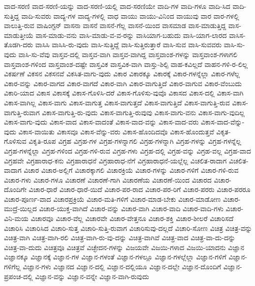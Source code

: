 {ವಾದ-ಸರಣಿ
ವಾದ-ಸರಣಿ-ಯನ್ನು
ವಾದ-ಸರಣಿ-ಯಲ್ಲಿ
ವಾದ-ಸರಣಿಯೇ
ವಾದಿ-ಗಳ
ವಾದಿ-ಗಳೂ
ವಾದಿ-ಸಿದ
ವಾದಿ-ಸುತ್ತಿದ್ದ
ವಾದಿ-ಸುವರು
ವಾದ್ಯ-ಗಳ
ವಾದ್ಯ-ಗಳಲ್ಲಿ
ವಾಧ
ವಾಯು
ವಾಯು-ವಿನಿಂದ
ವಾಯುವು
ವಾರ
ವಾರ-ಗಳಲ್ಲಿ
ವಾಲುತ್ತಿ-ರುವ
ವಾಷಿಂಗ್ಟನ್
ವಾಸನಾ
ವಾಸನೆ
ವಾಸನೆ-ಗೆಲ್ಲ
ವಾಸನೆ-ಯಿಂದ
ವಾಸಮಾಡ
ವಾಸ-ಮಾಡುತ್ತಿದ್ದ
ವಾಸ-ಮಾಡುತ್ತೀಯೆ
ವಾಸ-ಮಾಡು-ವನು
ವಾಸಿ-ಮಾಡು-ವ-ವ-ರನ್ನು
ವಾಸಿಯಾಗ-ಬಹುದು
ವಾಸಿ-ಯಾಗ-ಲಾರದ
ವಾಸಿಸ-ತೊಡಗಿ-ದರು
ವಾಸಿಸಿ
ವಾಸಿಸಿ-ರು-ವುದು
ವಾಸಿ-ಸುತ್ತಿದ್ದೆ
ವಾಸಿ-ಸುತ್ತಿರುತ್ತಾರೆ
ವಾಸಿ-ಸುವ
ವಾಸಿ-ಸುವವರು
ವಾಸಿ-ಸು-ವುದು
ವಾಸಿ-ಸು-ವೆವು
ವಾಸ್ತವ-ದಲ್ಲಿ
ವಾಸ್ತವ-ವಾಗಿ
ವಾಸ್ತವ-ವಾಗಿದ್ದ
ವಾಸ್ತವಾಂಶ-ಗಳನ್ನು
ವಾಸ್ತವಾಂಶ-ಗಳಾಗಲಿ
ವಾಸ್ತವಾಂಶ-ಗಳಿಂದ
ವಾಸ್ತವಾಂಶ-ದಷ್ಟೇ
ವಾಸ್ತವಿಕ
ವಾಸ್ತವಿಕ-ವಾಗಿ
ವಾಸ್ತು-ಶಿಲ್ಪಿ
ವಾಹ-ಕವಿಲ್ಲದೆ
ವಾಹನ-ಗಳಿ-ರ-ಲಿಲ್ಲ
ವಿಕರ್ಷಣೆ
ವಿಕಸನ
ವಿಕಸನವೆ
ವಿಕಸಿತ-ವಾಗು-ವುದು
ವಿಕಾರ
ವಿಕಾರಕ್ಕೂ
ವಿಕಾರಕ್ಕೆ
ವಿಕಾರ-ಗಳನ್ನೆಲ್ಲಾ
ವಿಕಾರ-ಗಳೆಲ್ಲ
ವಿಕಾರ-ವನ್ನು
ವಿಕಾರ-ವಾಗದ
ವಿಕಾರ-ವಾಗದೆ
ವಿಕಾರ-ವಾಗಿ
ವಿಕಾರ-ವಾಗುತ್ತಿದೆ
ವಿಕಾರ-ವಾಗುವ
ವಿಕಾರ-ವೆಂಬುದು
ವಿಕಾರಿ-ಯಾದ
ವಿಕಾಸ
ವಿಕಾಸಕ್ಕೆ
ವಿಕಾಸ-ಗೊಳಿಸಿ-ದರೆ
ವಿಕಾಸ-ಗೊಳಿಸು-ವುವೊ
ವಿಕಾಸದ
ವಿಕಾಸ-ದಲ್ಲಿ
ವಿಕಾಸ-ವಾಗಿ
ವಿಕಾಸ-ವಾಗಿಲ್ಲ
ವಿಕಾಸ-ವಾಗು
ವಿಕಾಸ-ವಾಗುತ್ತ
ವಿಕಾಸ-ವಾಗುತ್ತದೆ
ವಿಕಾಸ-ವಾಗುತ್ತಿದೆ
ವಿಕಾಸ-ವಾಗುತ್ತಿ-ರುವ
ವಿಕಾಸ-ವಾಗುತ್ತಿ-ರುವಾಗ
ವಿಕಾಸ-ವಾಗುತ್ತಿ-ರು-ವುದು
ವಿಕಾಸ-ವಾಗುತ್ತಿ-ರುವುವು
ವಿಕಾಸ-ವಾಗು-ವನು
ವಿಕಾಸ-ವಾಗು-ವುದಿಲ್ಲ
ವಿಕಾಸ-ವಾಗು-ವುದು
ವಿಕಾಸ-ವಾದ
ವಿಕಾಸ-ವಾದಂತೆ
ವಿಕಾಸ-ವಾದ-ವನ್ನು
ವಿಕಾಸ-ವಾದ-ವರು
ವಿಕಾಸ-ವಾದ-ವೆನ್ನು-ವುದು
ವಿಕಾಸ-ವಾಯಿತು
ವಿಕಾಸವೂ
ವಿಕಾಸ-ವೆನ್ನು-ವರು
ವಿಕಾಸ-ಹೊಂದಿದವೊ
ವಿಕಾಸ-ಹೊಂದುತ್ತವೆ
ವಿಕೃತ-ಗೊಳಿಸುವ
ವಿಕೃತಿ-ರೂಪ
ವಿಗ್ರಹ
ವಿಗ್ರಹ-ಗಳ
ವಿಗ್ರಹ-ಗಳನ್ನಾಗಲಿ
ವಿಗ್ರಹ-ಗಳನ್ನಾಗಿ
ವಿಗ್ರಹ-ಗಳನ್ನು
ವಿಗ್ರಹ-ಗಳನ್ನೆಲ್ಲ
ವಿಗ್ರಹ-ಗಳನ್ನೆಲ್ಲಾ
ವಿಗ್ರಹ-ಗಳಿಂದ
ವಿಗ್ರಹ-ಗಳಿ-ರುವ
ವಿಗ್ರಹ-ಗಳು
ವಿಗ್ರಹ-ದಲ್ಲಿ
ವಿಗ್ರಹ-ವನ್ನು
ವಿಗ್ರಹ-ವಲ್ಲ
ವಿಗ್ರಹ-ವಾದ
ವಿಗ್ರಹವೇ
ವಿಗ್ರಹಾರಾಧ-ಕನು
ವಿಗ್ರಹಾರಾಧನೆ
ವಿಗ್ರಹಾರಾಧ-ನೆಗೆ
ವಿಗ್ರಹಾರಾಧನೆ-ಯಲ್ಲೆಲ್ಲ
ವಿಚಲಿತ-ರಾದಾಗ
ವಿಚಲಿತ-ವಾದಾಗ
ವಿಚಾರ
ವಿಚಾರ-ಅಲ್ಲಿಗೆ
ವಿಚಾರಕ್ಕಾಗಲಿ
ವಿಚಾರಕ್ರಿಯೆ
ವಿಚಾರ-ಗಳನ್ನು
ವಿಚಾರ-ಗಳಿಗೆ
ವಿಚಾರ-ಗಳಿ-ರುವ
ವಿಚಾರ-ಗಳು
ವಿಚಾರ-ಗಳೂ
ವಿಚಾರಣೆ
ವಿಚಾರಣೆ-ಗಾಗಿ
ವಿಚಾರಣೆಯ
ವಿಚಾರಣೆ-ಯಿಂದ
ವಿಚಾರದ
ವಿಚಾರ-ದೊಂದಿಗೇ
ವಿಚಾರ-ಧಾರೆ
ವಿಚಾರ-ಧಾರೆ-ಯಿದೆ
ವಿಚಾರ-ಪರ-ರಾದ
ವಿಚಾರ-ಪರ-ರಿಗೆ
ವಿಚಾರ-ಪರರು
ವಿಚಾರ-ಪರರೂ
ವಿಚಾರ-ಪೂರ್ಣ-ವಾದ
ವಿಚಾರಪ್ರಕ್ರಿಯೆ
ವಿಚಾರ-ಮತಿ-ಗಳಿಗೆ
ವಿಚಾರ-ಮಾಡ-ಬೇಕು
ವಿಚಾರ-ಮಾಡೋಣ
ವಿಚಾರ-ಮುದ್ರೆ-ಯಿಲ್ಲದ
ವಿಚಾರ-ಯುಕ್ತ-ವಾಗಿದೆ
ವಿಚಾರ-ವನ್ನು
ವಿಚಾರ-ವಾಗಿ
ವಿಚಾರ-ವಾದಿ
ವಿಚಾರ-ವಾದಿ-ಗಳು
ವಿಚಾರ-ವಿನಿ-ಮಯ
ವಿಚಾರವೂ
ವಿಚಾರ-ವೆಲ್ಲ
ವಿಚಾರವೇ
ವಿಚಾರ-ವೇತ್ತನೂ
ವಿಚಾರ-ಶಕ್ತಿ
ವಿಚಾರ-ಶೀಲರೆ
ವಿಚಾರಿಸದೆ
ವಿಚಾರಿಸಿ
ವಿಚಾರಿಸಿದ
ವಿಚಾರಿ-ಸುತ್ತ
ವಿಚಾರಿ-ಸುತ್ತಿ-ರುವಾಗ
ವಿಚಾರಿಸುವು-ದಲ್ಲದೆ
ವಿಚಾರಿ-ಸೋಣ
ವಿಚಿತ್ರ
ವಿಚಿತ್ರ-ವನ್ನು
ವಿಚಿತ್ರ-ವಾಗಿ
ವಿಚಿತ್ರ-ವಾಗಿ-ರಲಿ
ವಿಚಿತ್ರ-ವಾಗಿ-ರು-ವು-ದನ್ನು
ವಿಚಿತ್ರ-ವಾಗಿವೆ
ವಿಚಿತ್ರ-ವಾದ
ವಿಚಿತ್ರ-ವಾ-ದು-ದನ್ನು
ವಿಚಿತ್ರ-ವಾ-ದುದು
ವಿಚಿತ್ರವೂ
ವಿಚಿತ್ರವೆ
ವಿಚ್ಛೇದನ-ಗಳನ್ನು
ವಿಜಯವೇ
ವಿಜಯಿ-ಗಳಾದ
ವಿಜಯಿ-ಯಾದನು
ವಿಜ್ಞಾನ
ವಿಜ್ಞಾನಕ್ಕೂ
ವಿಜ್ಞಾನಕ್ಕೆ
ವಿಜ್ಞಾನ-ಗಳ
ವಿಜ್ಞಾನ-ಗಳಂತೆ
ವಿಜ್ಞಾನ-ಗಳಲ್ಲೂ
ವಿಜ್ಞಾನ-ಗಳಲ್ಲೆಲ್ಲಾ
ವಿಜ್ಞಾನ-ಗಳಿಗೆ
ವಿಜ್ಞಾನ-ಗಳಿಗೆಲ್ಲ
ವಿಜ್ಞಾನ-ಗಳು
ವಿಜ್ಞಾನದ
ವಿಜ್ಞಾನ-ದಲ್ಲಿ
ವಿಜ್ಞಾನ-ದಲ್ಲಿಯೂ
ವಿಜ್ಞಾನ-ದಲ್ಲೇ
ವಿಜ್ಞಾನ-ದೊಂದಿಗೆ
ವಿಜ್ಞಾನ-ಪ್ರಪಂಚ-ದಲ್ಲಿ
ವಿಜ್ಞಾನ-ವನ್ನು
ವಿಜ್ಞಾನ-ವನ್ನೇ
ವಿಜ್ಞಾನ-ವಾಗಿ-ರುವುದು
}
